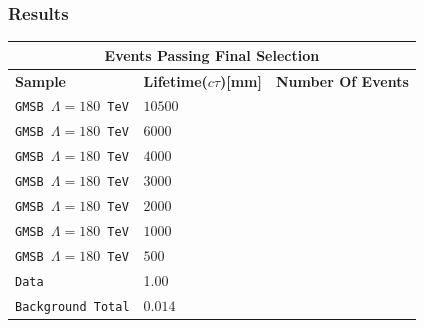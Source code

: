 \documentclass{beamer}
\begin{document}
\begin{frame}
\frametitle{Results}
\begin{minipage}[t]{0.8\textwidth}
\centering
\begin{tabular}{l l l}
\multicolumn{3}{c}{\bfseries{Events Passing Final Selection}} \\
  \hline
   \bfseries{Sample} &\bfseries{Lifetime($c\tau$)[mm]} &\bfseries{Number Of Events} \\
   \hline
   \texttt{GMSB $\Lambda=180$ TeV}& $10500$ & \\
   \texttt{GMSB $\Lambda=180$ TeV}& $ 6000$ &  \\
   \texttt{GMSB $\Lambda=180$ TeV}& $ 4000$&  \\
   \texttt{GMSB $\Lambda=180$ TeV}& $ 3000 $&   \\
   \texttt{GMSB $\Lambda=180$ TeV}& $ 2000$&   \\
   \texttt{GMSB $\Lambda=180$ TeV}& $ 1000$&  \\
   \texttt{GMSB $\Lambda=180$ TeV}& $ 500$&  \\
   \hline
   \texttt{Data} & 1.00 &    \\
   \texttt{Background Total} & $0.014$ & \\
  \hline \hline
 \end{tabular} 
 \end{minipage}
\end{frame}
\end{document}
